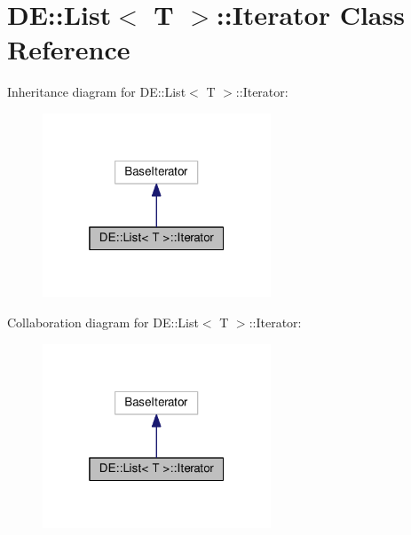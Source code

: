 \hypertarget{classDE_1_1List_1_1Iterator}{}\section{DE\+:\+:List$<$ T $>$\+:\+:Iterator Class Reference}
\label{classDE_1_1List_1_1Iterator}


Inheritance diagram for DE\+:\+:List$<$ T $>$\+:\+:Iterator\+:\nopagebreak
\begin{figure}[H]
\begin{center}
\leavevmode
\includegraphics[width=193pt]{classDE_1_1List_1_1Iterator__inherit__graph}
\end{center}
\end{figure}


Collaboration diagram for DE\+:\+:List$<$ T $>$\+:\+:Iterator\+:\nopagebreak
\begin{figure}[H]
\begin{center}
\leavevmode
\includegraphics[width=193pt]{classDE_1_1List_1_1Iterator__coll__graph}
\end{center}
\end{figure}
